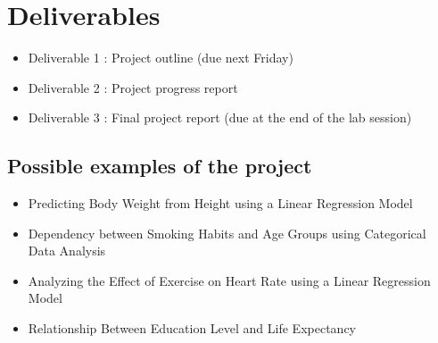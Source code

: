 \documentclass[12pt]{article}
\begin{document}
    
        
\section*{Deliverables}
\begin{itemize}
    \item Deliverable 1 : Project outline (due next Friday)
    \item Deliverable 2 : Project progress report
    \item Deliverable 3 : Final project report (due at the end of the lab session)
\end{itemize}







\subsection*{Possible examples of the project}
\begin{itemize}
    \item Predicting Body Weight from Height using a Linear Regression Model
    \item Dependency between Smoking Habits and Age Groups using Categorical Data Analysis
    \item Analyzing the Effect of Exercise on Heart Rate using a Linear Regression Model 
    \item Relationship Between Education Level and Life Expectancy
\end{itemize}
\end{document}
